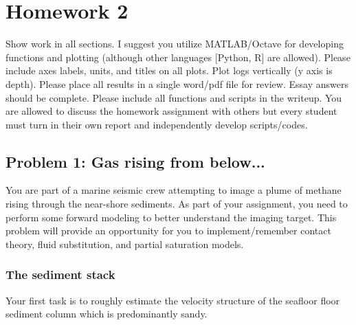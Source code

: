 
\chapter{Homework 2}
Show work in all sections. I suggest you utilize MATLAB/Octave for developing functions and plotting (although other languages [Python, R] are allowed). Please include axes labels, units, and titles on all plots. Plot logs vertically (y axis is depth). Please place all results in a single word/pdf file for review. Essay answers should be complete. Please include all functions and scripts in the writeup. You are allowed to discuss the homework assignment with others but every student must turn in their own report and independently develop scripts/codes.


\section{Problem 1: Gas rising from below...}
You are part of a marine seismic crew attempting to image a plume of methane rising through the near-shore sediments. As part of your assignment, you need to perform some forward modeling to better understand the imaging target. This problem will provide an opportunity for you to implement/remember contact theory, fluid substitution, and partial saturation models.


\subsection{The sediment stack}
Your first task is to roughly estimate the velocity structure of the seafloor floor sediment column which is predominantly sandy.

